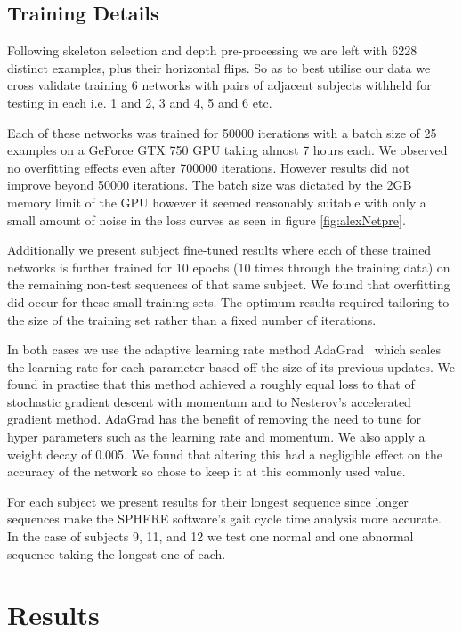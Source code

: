 \documentclass[11pt]{article} %
\begin{document}
\subsection{Training Details}


Following skeleton selection and depth pre-processing we are left with 6228 distinct examples, plus their horizontal flips. So as to best utilise our data we cross validate training 6 networks with pairs of adjacent subjects withheld for testing in each i.e. 1 and 2, 3 and 4, 5 and 6 etc. 

Each of these networks was trained for 50000 iterations with a batch size of 25 examples on a GeForce GTX 750 GPU taking almost 7 hours each. We observed no overfitting effects even after 700000 iterations. However results did not improve beyond 50000 iterations. The batch size was dictated by the 2GB memory limit of the GPU however it seemed reasonably suitable with only a small amount of noise in the loss curves as seen in figure \ref{fig:alexNetpre}.

Additionally we present subject fine-tuned results where each of these trained networks is further trained for 10 epochs (10 times through the training data) on the remaining non-test sequences of that same subject. We found that overfitting did occur for these small training sets. The optimum results required tailoring to the size of the training set rather than a fixed number of iterations. 

In both cases we use the adaptive learning rate method AdaGrad~\cite{Duchi2011} which scales the learning rate for each parameter based off the size of its previous updates. We found in practise that this method achieved a roughly equal loss to that of stochastic gradient descent with momentum and to Nesterov's accelerated gradient method. AdaGrad has the benefit of removing the need to tune for hyper parameters such as the learning rate and momentum. We also apply a weight decay of 0.005. We found that altering this had a negligible effect on the accuracy of the network so chose to keep it at this commonly used value.

For each subject we present results for their longest sequence since longer sequences make the SPHERE software's gait cycle time analysis more accurate. In the case of subjects 9, 11, and 12 we test one normal and one abnormal sequence taking the longest one of each. 

\section{Results}
\label{sec:results}
\end{document}
